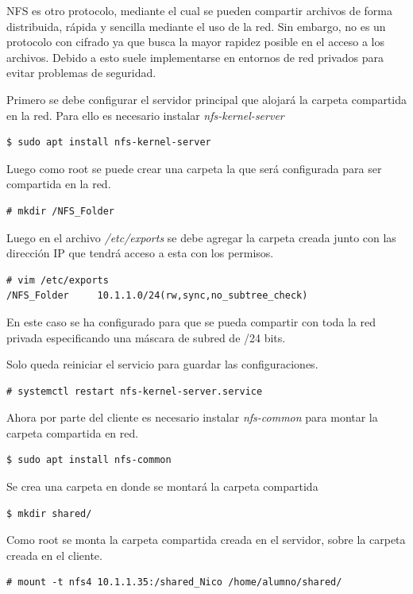\documentclass[12pt]{article}
\begin{document}
NFS es otro protocolo, mediante el cual se pueden compartir archivos de forma distribuida, rápida y sencilla mediante el uso de la red. Sin embargo, no es un protocolo con cifrado ya que busca la mayor rapidez posible en el acceso a los archivos. Debido a esto suele implementarse en entornos de red privados para evitar problemas de seguridad. \cite{nfs}


Primero se debe configurar el servidor principal que alojará la carpeta compartida en la red. Para ello es necesario instalar \emph{nfs-kernel-server}

\begin{lstlisting}[frame=single]
$ sudo apt install nfs-kernel-server
\end{lstlisting}

Luego como root se puede crear una carpeta la que será configurada para ser compartida en la red.
\begin{lstlisting}[frame=single]
# mkdir /NFS_Folder
\end{lstlisting}

Luego en el archivo \emph{/etc/exports} se debe agregar la carpeta creada junto con las dirección IP que tendrá acceso a esta con los permisos. 
\begin{lstlisting}[frame=single]
# vim /etc/exports
/NFS_Folder		10.1.1.0/24(rw,sync,no_subtree_check)
\end{lstlisting}
En este caso se ha configurado para que se pueda compartir con toda la red privada especificando una máscara de subred de /24 bits.

Solo queda reiniciar el servicio para guardar las configuraciones.
\begin{lstlisting}[frame=single]
# systemctl restart nfs-kernel-server.service
\end{lstlisting}

Ahora por parte del cliente es necesario instalar \emph{nfs-common} para montar la carpeta compartida en red.
\begin{lstlisting}[frame=single]
$ sudo apt install nfs-common
\end{lstlisting}

Se crea una carpeta en donde se montará la carpeta compartida
\begin{lstlisting}[frame=single]
$ mkdir shared/
\end{lstlisting}

Como root se monta la carpeta compartida creada en el servidor, sobre la carpeta creada en el cliente. 
\begin{lstlisting}[frame=single]
# mount -t nfs4 10.1.1.35:/shared_Nico /home/alumno/shared/
\end{lstlisting}
\end{document}
